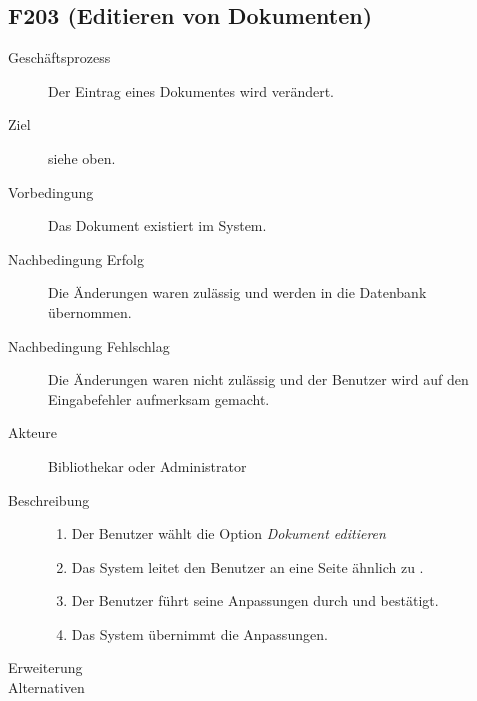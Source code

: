 \subsection{F203 (Editieren von Dokumenten)}
\begin{description}
  \item[Geschäftsprozess]Der Eintrag eines Dokumentes wird verändert.
  \item[Ziel]siehe oben.
  \item[Vorbedingung]Das Dokument existiert im System.
  \item[Nachbedingung Erfolg]Die Änderungen waren zulässig und werden in die Datenbank übernommen.
  \item[Nachbedingung Fehlschlag]Die Änderungen waren nicht zulässig und der Benutzer wird auf den Eingabefehler aufmerksam gemacht.
  \item[Akteure]Bibliothekar oder Administrator
  \item[Beschreibung]\hfill
    \begin{enumerate}
      \item Der Benutzer wählt die Option \emph{Dokument editieren}
      \item Das System leitet den Benutzer an eine Seite ähnlich zu .
      \item Der Benutzer führt seine Anpassungen durch und bestätigt.
      \item Das System übernimmt die Anpassungen.
    \end{enumerate}
  \item[Erweiterung]
  \item[Alternativen]
\end{description}


